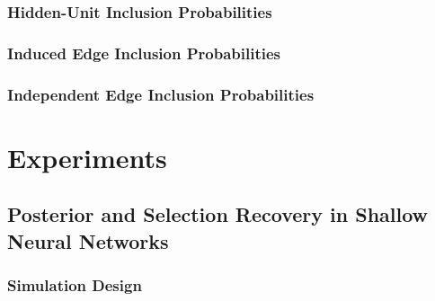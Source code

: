 \documentclass{article}
\begin{document}
\subsubsection{Hidden-Unit Inclusion Probabilities}

%


\subsubsection{Induced Edge Inclusion Probabilities}

%
%
%
%


\subsubsection{Independent Edge Inclusion Probabilities}

%



\section{Experiments}
\label{sec:experiments}



\subsection{Posterior and Selection Recovery in Shallow Neural Networks}
\label{sec:shallow}

%


\subsubsection{Simulation Design}
\label{sec:shallow_setup}

%
%
%
%
%
%
%
%
\end{document}
